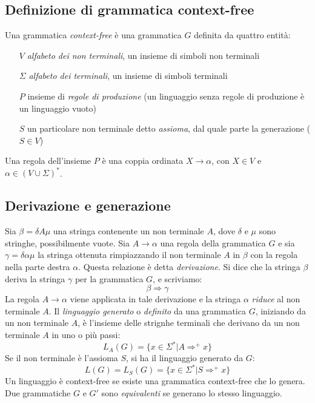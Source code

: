 \documentclass[11pt]{article}
\begin{document}
\subsection{Definizione di grammatica context-free}
Una grammatica \textit{context-free} è una grammatica $G$ definita da quattro entità:
\begin{itemize}
    \item[$V$ ] \textit{alfabeto dei non terminali}, un insieme di simboli non terminali 
    \item[$\Sigma$ ] \textit{alfabeto dei terminali}, un insieme di simboli terminali 
    \item[$P$ ] insieme di \textit{regole di produzione} (un linguaggio senza regole di produzione è un linguaggio vuoto)
    \item[$S$ ] un particolare non terminale detto \textit{assioma}, dal quale parte la generazione ($S\in V$)
\end{itemize}
Una regola dell'insieme $P$ è una coppia ordinata $X\rightarrow\alpha$, con $X\in V$ e $\alpha\in(V\cup \Sigma)^*$.
\subsection{Derivazione e generazione}
Sia $\beta=\delta A\mu$ una stringa contenente un non terminale $A$, dove $\delta$ e $\mu$ sono stringhe, possibilmente 
vuote. Sia $A\rightarrow\alpha$ una regola della grammatica $G$ e sia $\gamma=\delta\alpha\mu$ la stringa ottenuta rimpiazzando 
il non terminale $A$ in $\beta$ con la regola nella parte destra $\alpha$. Questa relazione è detta \textit{derivazione}.
Si dice che la stringa $\beta$ deriva la stringa $\gamma$ per la grammatica $G$, e scriviamo:
\begin{equation*}
    \beta\Rightarrow\gamma
\end{equation*}
La regola $A\rightarrow\alpha$ viene applicata in tale derivazione e la stringa $\alpha$ \textit{riduce} al non terminale 
$A$.
Il \textit{linguaggio generato} o \textit{definito} da una grammatica $G$, iniziando da un non terminale $A$, è l'insieme 
delle strignhe terminali che derivano da un non terminale $A$ in uno o più passi:
\begin{equation*}
    L_A(G)=\{x\in\Sigma^*|A\Rightarrow^+ x\}
\end{equation*}
Se il non terminale è l'assioma $S$, si ha il linguaggio generato da $G$:
\begin{equation*}
    L(G)=L_S(G)=\{x\in\Sigma^*|S\Rightarrow^+ x\}
\end{equation*}
Un linguaggio è context-free se esiste una grammatica context-free che lo genera. Due grammatiche $G$ e $G'$ sono 
\textit{equivalenti} se generano lo stesso linguaggio.
\end{document}
